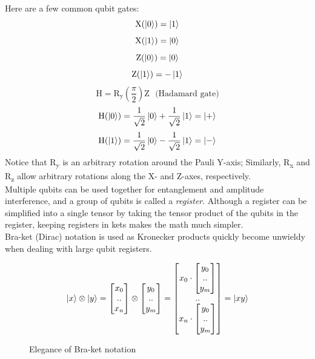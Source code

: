 \documentclass[12pt]{article}
\begin{document}
\noindent Here are a few common qubit gates:
$$ \text{X}(\ket{0}) = \ket{1} $$
$$ \text{X}(\ket{1}) = \ket{0} $$
$$ \text{Z}(\ket{0}) = \ket{0} $$
$$ \text{Z}(\ket{1}) = -\ket{1} $$
$$ \text{H} = \text{R}_{\text{y}} (\frac{\pi}{2}) \text{Z} \ \ \ \text{(Hadamard gate)}$$
$$ \text{H}(\ket{0}) = \frac{1}{\sqrt{2}} \ket{0} + \frac{1}{\sqrt{2}} \ket{1} = \ket{+} $$
$$ \text{H}(\ket{1}) = \frac{1}{\sqrt{2}} \ket{0} - \frac{1}{\sqrt{2}} \ket{1} = \ket{-} $$
Notice that R\textsubscript{y} is an arbitrary rotation around the Pauli Y-axis; Similarly, R\textsubscript{x} and R\textsubscript{z} allow arbitrary rotations along the X- and Z-axes, respectively.\\
Multiple qubits can be used together for entanglement and amplitude interference, and a group of qubits is called a \textit{register}. Although a register can be simplified into a single tensor by taking the tensor product of the qubits in the register, keeping registers in kets makes the math much simpler. \\
Bra-ket (Dirac) notation is used as Kronecker products quickly become unwieldy when dealing with large qubit registers.

\begin{figure}[h]
    \centering
    $$ \ket{x} \otimes \ket{y} = \begin{bmatrix} x_0 \\ .. \\ x_n \end{bmatrix} \otimes \begin{bmatrix} y_0 \\ .. \\ y_m \end{bmatrix} = \begin{bmatrix} x_0 \cdot \begin{bmatrix} y_0 \\ .. \\ y_m \end{bmatrix} \\ .. \\ x_n \cdot \begin{bmatrix} y_0 \\ .. \\ y_m \end{bmatrix} \end{bmatrix} = \ket{xy} $$
    \caption{Elegance of Bra-ket notation}
    \label{fig:my_label}
\end{figure}
\end{document}
